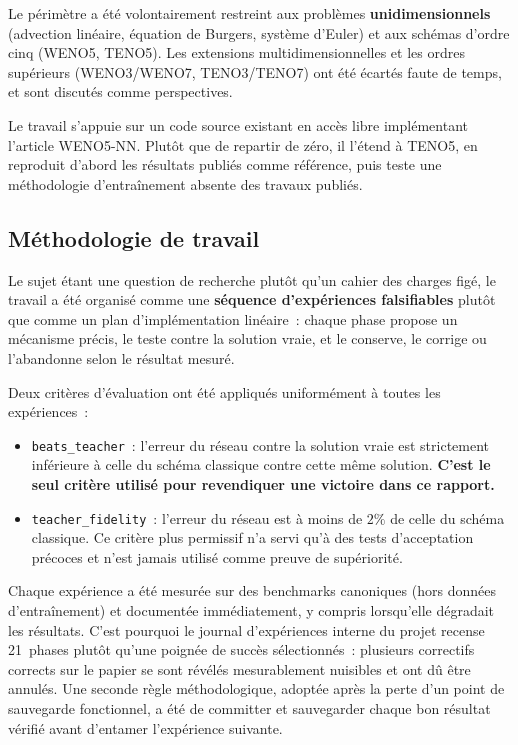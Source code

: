 \documentclass[12pt,a4paper,oneside]{report}
\begin{document}
Le périmètre a été volontairement restreint aux problèmes
\textbf{unidimensionnels} (advection linéaire, équation de Burgers, système
d'Euler) et aux schémas d'ordre cinq (WENO5, TENO5). Les extensions
multidimensionnelles et les ordres supérieurs (WENO3/WENO7, TENO3/TENO7) ont
été écartés faute de temps, et sont discutés comme perspectives.

Le travail s'appuie sur un code source existant en accès libre implémentant
l'article WENO5-NN. Plutôt que de repartir de zéro, il l'étend à TENO5, en
reproduit d'abord les résultats publiés comme référence, puis teste une
méthodologie d'entraînement absente des travaux publiés.

\subsection*{Méthodologie de travail}

Le sujet étant une question de recherche plutôt qu'un cahier des charges figé,
le travail a été organisé comme une \textbf{séquence d'expériences
falsifiables} plutôt que comme un plan d'implémentation linéaire~: chaque phase
propose un mécanisme précis, le teste contre la solution vraie, et le conserve,
le corrige ou l'abandonne selon le résultat mesuré.

Deux critères d'évaluation ont été appliqués uniformément à toutes les
expériences~:

\begin{itemize}
  \item \texttt{beats\_teacher}~: l'erreur du réseau contre la solution vraie
  est strictement inférieure à celle du schéma classique contre cette même
  solution. \textbf{C'est le seul critère utilisé pour revendiquer une victoire
  dans ce rapport.}
  \item \texttt{teacher\_fidelity}~: l'erreur du réseau est à moins de $2\%$ de
  celle du schéma classique. Ce critère plus permissif n'a servi qu'à des tests
  d'acceptation précoces et n'est jamais utilisé comme preuve de supériorité.
\end{itemize}

Chaque expérience a été mesurée sur des benchmarks canoniques (hors données
d'entraînement) et documentée immédiatement, y compris lorsqu'elle dégradait
les résultats. C'est pourquoi le journal d'expériences interne du projet
recense 21~phases plutôt qu'une poignée de succès sélectionnés~: plusieurs
correctifs corrects sur le papier se sont révélés mesurablement nuisibles et
ont dû être annulés. Une seconde règle méthodologique, adoptée après la perte
d'un point de sauvegarde fonctionnel, a été de committer et sauvegarder chaque
bon résultat vérifié avant d'entamer l'expérience suivante.
\end{document}

